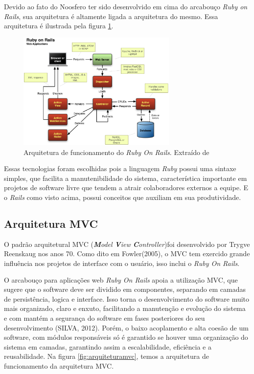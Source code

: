 Devido ao fato do Noosfero ter sido desenvolvido em cima do arcabouço \textit{Ruby on Rails}, sua arquitetura é altamente ligada a arquitetura do mesmo. Essa arquitetura é ilustrada pela figura \ref{fig:arquiteturaror}.

\graphicspath{{figuras/}}
\begin{figure}[H]
\centering
\includegraphics[width=0.7\textwidth]{rails-overview}
\caption{Arquitetura de funcionamento do \textit{Ruby On Rails}. Extraído de \cite{mejia2011rails}}
\label{fig:arquiteturaror}
\end{figure}

Essas tecnologias foram escolhidas pois a linguagem \textit{Ruby} possui uma sintaxe simples, que facilita a manutenibilidade do sistema, característica importante em projetos de software livre que tendem a atrair colaboradores externos a equipe. E o \textit{Rails} como visto acima, possui conceitos que auxiliam em sua produtividade. %

\subsection{Arquitetura MVC}
\label{sub:arquiteturamvc}

O padrão arquitetural MVC (\textit{\textbf{M}odel \textbf{V}iew \textbf{C}ontroller})foi desenvolvido por Trygve Reenskaug nos anos 70. Como dito em Fowler(2005), o MVC tem exercido grande influência nos projetos de interface com o usuário, isso inclui o \textit{Ruby On Rails}.

O arcabouço para aplicações web \textit{Ruby On Rails} apoia a utilização  MVC, que sugere que o software deve ser dividido em componentes, separando em camadas de persistência, logica e interface. Isso torna o desenvolvimento do software muito mais organizado, claro e enxuto, facilitando a manutenção e evolução do sistema e com mantém a segurança do software em fases posteriores do seu desenvolvimento\cite{} (SILVA, 2012). Porém, o baixo acoplamento e alta coesão de um software, com módulos responsáveis só é garantido se houver uma organização do sistema em camadas, garantindo assim a escalabilidade, eficiência e a reusabilidade. Na figura \ref{fig:arquiteturamvc}, temos a arquitetura de funcionamento da arquitetura MVC.

